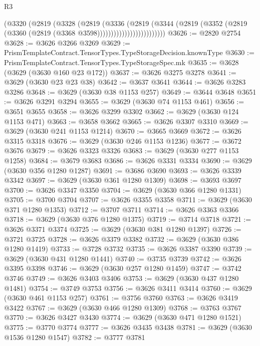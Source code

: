 \begin{lexlean}{R3}
\begin{coremodule}
                            (@3320
                              (@2819
                                (@3328
                                  (@2819
                                    (@3336
                                      (@2819
                                        (@3344
                                          (@2819
                                            (@3352
                                              (@2819
                                                (@3360 (@2819 (@3368 @3598)))))))))))))))))))))))))
@3626 := @2820 @2754
@3628 := @3626 @3266 @3269
@3629 := PrismTemplateContract.TensorTypes.TypeStorageDecision.knownType
@3630 := PrismTemplateContract.TensorTypes.TypeStorageSpec.mk
@3635 := @3628 (@3629 (@3630 @160 @23 @172))
@3637 := @3626 @3275 @3278
@3641 := @3629 (@3630 @23 @23 @38)
@3642 := @3637 @3641
@3644 := @3626 @3283 @3286
@3648 := @3629 (@3630 @38 @1153 @257)
@3649 := @3644 @3648
@3651 := @3626 @3291 @3294
@3655 := @3629 (@3630 @74 @1153 @461)
@3656 := @3651 @3655
@3658 := @3626 @3299 @3302
@3662 := @3629 (@3630 @124 @1153 @471)
@3663 := @3658 @3662
@3665 := @3626 @3307 @3310
@3669 := @3629 (@3630 @241 @1153 @1214)
@3670 := @3665 @3669
@3672 := @3626 @3315 @3318
@3676 := @3629 (@3630 @246 @1153 @1236)
@3677 := @3672 @3676
@3679 := @3626 @3323 @3326
@3683 := @3629 (@3630 @277 @1153 @1258)
@3684 := @3679 @3683
@3686 := @3626 @3331 @3334
@3690 := @3629 (@3630 @356 @1280 @1287)
@3691 := @3686 @3690
@3693 := @3626 @3339 @3342
@3697 := @3629 (@3630 @361 @1280 @1309)
@3698 := @3693 @3697
@3700 := @3626 @3347 @3350
@3704 := @3629 (@3630 @366 @1280 @1331)
@3705 := @3700 @3704
@3707 := @3626 @3355 @3358
@3711 := @3629 (@3630 @371 @1280 @1353)
@3712 := @3707 @3711
@3714 := @3626 @3363 @3366
@3718 := @3629 (@3630 @376 @1280 @1375)
@3719 := @3714 @3718
@3721 := @3626 @3371 @3374
@3725 := @3629 (@3630 @381 @1280 @1397)
@3726 := @3721 @3725
@3728 := @3626 @3379 @3382
@3732 := @3629 (@3630 @386 @1280 @1419)
@3733 := @3728 @3732
@3735 := @3626 @3387 @3390
@3739 := @3629 (@3630 @431 @1280 @1441)
@3740 := @3735 @3739
@3742 := @3626 @3395 @3398
@3746 := @3629 (@3630 @257 @1280 @1459)
@3747 := @3742 @3746
@3749 := @3626 @3403 @3406
@3753 := @3629 (@3630 @437 @1280 @1481)
@3754 := @3749 @3753
@3756 := @3626 @3411 @3414
@3760 := @3629 (@3630 @461 @1153 @257)
@3761 := @3756 @3760
@3763 := @3626 @3419 @3422
@3767 := @3629 (@3630 @466 @1280 @1309)
@3768 := @3763 @3767
@3770 := @3626 @3427 @3430
@3774 := @3629 (@3630 @471 @1280 @1521)
@3775 := @3770 @3774
@3777 := @3626 @3435 @3438
@3781 := @3629 (@3630 @1536 @1280 @1547)
@3782 := @3777 @3781

\end{coremodule}
\end{lexlean}
